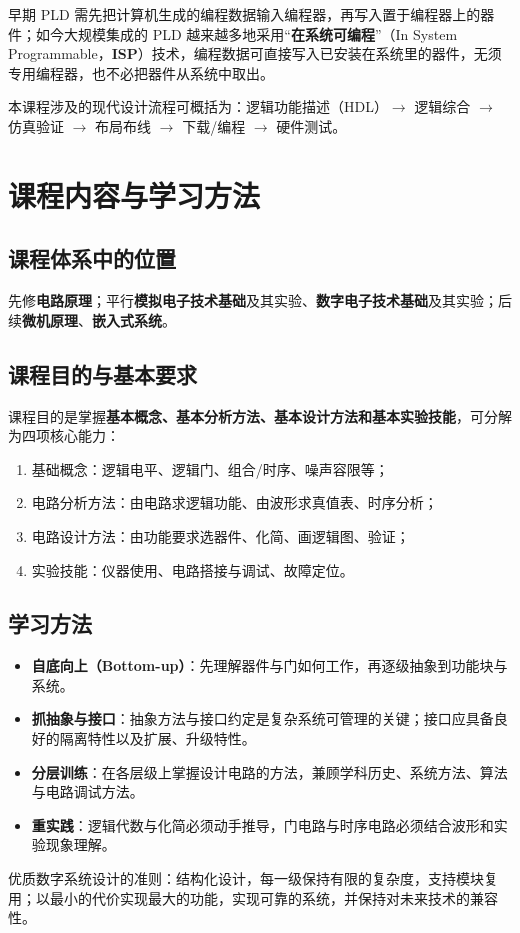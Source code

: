 早期 PLD 需先把计算机生成的编程数据输入编程器，再写入置于编程器上的器件；如今大规模集成的 PLD 越来越多地采用``\textbf{在系统可编程}''（In System Programmable，\textbf{ISP}）技术，编程数据可直接写入已安装在系统里的器件，无须专用编程器，也不必把器件从系统中取出。

本课程涉及的现代设计流程可概括为：逻辑功能描述（HDL）$\rightarrow$ 逻辑综合 $\rightarrow$ 仿真验证 $\rightarrow$ 布局布线 $\rightarrow$ 下载/编程 $\rightarrow$ 硬件测试。

\section{课程内容与学习方法}
\subsection{课程体系中的位置}
先修\textbf{电路原理}；平行\textbf{模拟电子技术基础}及其实验、\textbf{数字电子技术基础}及其实验；后续\textbf{微机原理}、\textbf{嵌入式系统}。

\subsection{课程目的与基本要求}
课程目的是掌握\textbf{基本概念、基本分析方法、基本设计方法和基本实验技能}，可分解为四项核心能力：
\begin{enumerate}
    \item 基础概念：逻辑电平、逻辑门、组合/时序、噪声容限等；
    \item 电路分析方法：由电路求逻辑功能、由波形求真值表、时序分析；
    \item 电路设计方法：由功能要求选器件、化简、画逻辑图、验证；
    \item 实验技能：仪器使用、电路搭接与调试、故障定位。
\end{enumerate}

\subsection{学习方法}
\begin{itemize}
    \item \textbf{自底向上（Bottom-up）}：先理解器件与门如何工作，再逐级抽象到功能块与系统。
    \item \textbf{抓抽象与接口}：抽象方法与接口约定是复杂系统可管理的关键；接口应具备良好的隔离特性以及扩展、升级特性。
    \item \textbf{分层训练}：在各层级上掌握设计电路的方法，兼顾学科历史、系统方法、算法与电路调试方法。
    \item \textbf{重实践}：逻辑代数与化简必须动手推导，门电路与时序电路必须结合波形和实验现象理解。
\end{itemize}

优质数字系统设计的准则：结构化设计，每一级保持有限的复杂度，支持模块复用；以最小的代价实现最大的功能，实现可靠的系统，并保持对未来技术的兼容性。
